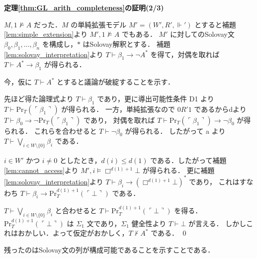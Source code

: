 \documentclass{jsarticle}
\makeatletter
\newcommand*{\Provable}{\mathrm{Pr}}
\theoremstyle{definition}
\renewcommand{\proofname}{証明}
\renewenvironment{proof}[1][\proofname]{\par
    \normalfont 
    \topsep6\p@\@plus6\p@\relax
    \trivlist
    \item\relax
    {\bfseries\gtfamily
    #1\@addpunct{.}}\hspace\labelsep\ignorespaces
    }{%
    \endtrivlist
    \@endpefalse
}
\makeatother
\begin{document}
\begin{proof}[定理\ref{thm:GL_arith_completeness}の証明(2/3)]
    $M,1 \nvDash A$ だった．$M$ の単純拡張モデル $M' = (W', R', \Vdash')$ とすると補題\ref{lem:simple_extension}より $M',1 \nvDash A$ でもある．
    $M'$ に対してのSolovay文 $\beta_0, \beta_1, \dots, \beta_n$ を構成し，$*$ はSolovay解釈とする．
    補題\ref{lem:solovay_interpretation}より $T \vdash \beta_1 \to \lnot A^*$ を得て，対偶を取れば $T \vdash A^* \to \beta_1$ が得られる．

    今，仮に $T \vdash A^*$ とすると議論が破綻することを示す．
    
    先ほど得た論理式より $T \vdash \beta_1$ であり，更に導出可能性条件 D1 より $T \vdash \Provable_T(\ulcorner \beta_1 \urcorner)$ が得られる．
    一方，単純拡張なので $0 R' 1$ であるからdより $T \vdash \beta_0 \to \lnot \Provable_T(\ulcorner \beta_1 \urcorner)$ であり，
    対偶を取れば $T \vdash \Provable_T(\ulcorner \beta_1 \urcorner) \to \lnot \beta_0$ が得られる．
    これらを合わせると $T \vdash \lnot \beta_0$ が得られる．
    したがって a より $T \vdash \bigvee_{i \in W \setminus \{0\}} \beta_i$ である． 

    $i \in W'$ かつ $i \neq 0$ としたとき，$d(i) \leq d(1)$ である．したがって補題 \ref{lem:cannot_access}より
    $M',i \vDash \Box^{d(1) + 1} \bot$ が得られる．
    更に補題\ref{lem:solovay_interpretation}より $T \vdash \beta_i \to (\Box^{d(1) + 1} \bot)^*$ であり，
    これはすなわち $T \vdash \beta_{i} \to \Provable^{d(1) + 1}_T(\ulcorner \bot \urcorner)$ である．

    $T \vdash \bigvee_{i \in W \setminus \{0\}} \beta_i$ と合わせると $T \vdash \Provable^{d(1) + 1}_T(\ulcorner \bot \urcorner)$ を得る．
    $\Provable^{d(1) + 1}_T(\ulcorner \bot \urcorner)$ は $\Sigma_1$ 文であり，$\Sigma_1$ 健全性より $T \vdash \bot$ が言える．
    しかしこれはおかしい．よって仮定がおかしく，$T \nvdash A^*$ である．
    \qed
\end{proof}

残ったのはSolovay文の列が構成可能であることを示すことである．

\printbibliography
\end{document}
